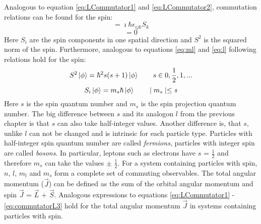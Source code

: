 Analogous to equation \ref{eq:LCommutator1} and \ref{eq:LCommutator2}, commutation relations can be found for the spin:
\begin{equation}
 [S_{i},S_{j}]=\imath\hbar\epsilon_{ijk}S_{k}
\end{equation} 
\begin{equation}
 [S_{i},S^{2}]=0
\end{equation} 
Here $S_{i}$ are the spin components in one spatial direction and $S^{2}$ is the squared norm of the spin. Furthermore, analogous to equations \ref{eq:ml} and \ref{eq:l} following relations hold for the spin:
\begin{equation}
 S^{2}\ket{\phi}=\hbar^{2}s(s+1)\ket{\phi} \hspace{2em} s\in{0,\frac{1}{2},1,...} 
\end{equation} 
\begin{equation}
 S_{i}\ket{\phi}=m_{s}\hbar\ket{\phi} \hspace{2em} \mid m_{s} \mid \leq \textit{s}
\end{equation} 
Here $s$ is the spin quantum number and $m_{s}$ is the spin projection quantum number. The big difference between $s$ and its analogon $l$ from the previous chapter is that $s$ can also take half-integer values. Another difference is, that $s$, unlike $l$ can not be changed and is intrinsic for each particle type. Particles with half-integer spin quantum number are called \textit{fermions}, particles with integer spin are called \textit{bosons}. In particular, leptons such as electrons have $s$ = $\frac{1}{2}$ and therefore $m_{s}$ can take the values $\pm$ $\frac{1}{2}$. For a system containing particles with spin, $n$, $l$, $m_{l}$ and $m_{s}$ form a complete set of commuting observables. The total angular momentum ($\vec{J}$) can be defined as the sum of the orbital angular momentum and spin $\vec{J}$ = $\vec{L}$ + $\vec{S}$. Analogous expressions to equations \ref{eq:LCommutator1} - \ref{eq:commutatorL3} hold for the total angular momentum $\vec{J}$ in systems containing particles with spin.

